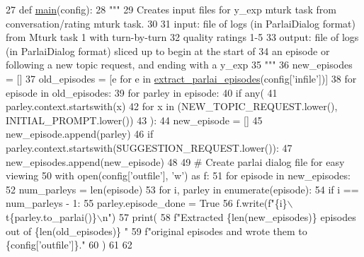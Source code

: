 \begin{DoxyCode}
27 \textcolor{keyword}{def }\hyperlink{namespaceprojects_1_1self__feeding_1_1scripts_1_1convert__rated__to__sliced_a818b0c6970270ed0a9a00c99e20faefd}{main}(config):
28     \textcolor{stringliteral}{"""}
29 \textcolor{stringliteral}{    Creates input files for y\_exp mturk task from conversation/rating mturk task.}
30 \textcolor{stringliteral}{}
31 \textcolor{stringliteral}{    input: file of logs (in ParlaiDialog format) from Mturk task 1 with turn-by-turn}
32 \textcolor{stringliteral}{        quality ratings 1-5}
33 \textcolor{stringliteral}{    output: file of logs (in ParlaiDialog format) sliced up to begin at the start of}
34 \textcolor{stringliteral}{        an episode or following a new topic request, and ending with a y\_exp}
35 \textcolor{stringliteral}{    """}
36     new\_episodes = []
37     old\_episodes = [e \textcolor{keywordflow}{for} e \textcolor{keywordflow}{in} \hyperlink{namespaceprojects_1_1self__feeding_1_1utils_a7bfa2fe610a2d0da7968b1a2662e0c23}{extract\_parlai\_episodes}(config[\textcolor{stringliteral}{'infile'}])]
38     \textcolor{keywordflow}{for} episode \textcolor{keywordflow}{in} old\_episodes:
39         \textcolor{keywordflow}{for} parley \textcolor{keywordflow}{in} episode:
40             \textcolor{keywordflow}{if} any(
41                 parley.context.startswith(x)
42                 \textcolor{keywordflow}{for} x \textcolor{keywordflow}{in} (NEW\_TOPIC\_REQUEST.lower(), INITIAL\_PROMPT.lower())
43             ):
44                 new\_episode = []
45             new\_episode.append(parley)
46             \textcolor{keywordflow}{if} parley.context.startswith(SUGGESTION\_REQUEST.lower()):
47                 new\_episodes.append(new\_episode)
48 
49     \textcolor{comment}{# Create parlai dialog file for easy viewing}
50     with open(config[\textcolor{stringliteral}{'outfile'}], \textcolor{stringliteral}{'w'}) \textcolor{keyword}{as} f:
51         \textcolor{keywordflow}{for} episode \textcolor{keywordflow}{in} new\_episodes:
52             num\_parleys = len(episode)
53             \textcolor{keywordflow}{for} i, parley \textcolor{keywordflow}{in} enumerate(episode):
54                 \textcolor{keywordflow}{if} i == num\_parleys - 1:
55                     parley.episode\_done = \textcolor{keyword}{True}
56                 f.write(f\textcolor{stringliteral}{"\{i\}\(\backslash\)t\{parley.to\_parlai()\}\(\backslash\)n"})
57     print(
58         f\textcolor{stringliteral}{"Extracted \{len(new\_episodes)\} episodes out of \{len(old\_episodes)\} "}
59         f\textcolor{stringliteral}{"original episodes and wrote them to \{config['outfile']\}."}
60     )
61 
62 
\end{DoxyCode}
